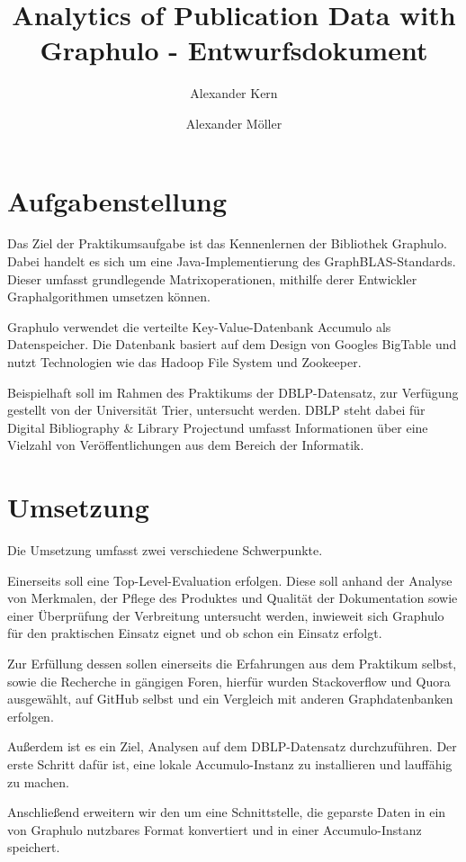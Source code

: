 \documentclass{article}
\title{Analytics of Publication Data with Graphulo - Entwurfsdokument}
\author{Alexander Kern \and Alexander Möller}
\begin{document}
\maketitle
	
\section{Aufgabenstellung}

Das Ziel der Praktikumsaufgabe ist das Kennenlernen der Bibliothek Graphulo. Dabei handelt es sich um eine Java-Implementierung des GraphBLAS-Standards. Dieser umfasst grundlegende Matrixoperationen, mithilfe derer Entwickler Graphalgorithmen umsetzen können. \cite{graph}

Graphulo verwendet die verteilte Key-Value-Datenbank Accumulo als Datenspeicher. Die Datenbank basiert auf dem Design von Googles BigTable und nutzt Technologien wie das Hadoop File System und Zookeeper. \cite{acc} 

Beispielhaft soll im Rahmen des Praktikums der DBLP-Datensatz, zur Verfügung gestellt von der Universität Trier, untersucht werden. DBLP steht dabei für \glqq Digital Bibliography \& Library Project\grqq und umfasst Informationen über eine Vielzahl von Veröffentlichungen aus dem Bereich der Informatik. \cite{dblp}


\section{Umsetzung}

Die Umsetzung umfasst zwei verschiedene Schwerpunkte. 

Einerseits soll eine Top-Level-Evaluation erfolgen. Diese soll anhand der Analyse von Merkmalen, der Pflege des Produktes und Qualität der Dokumentation sowie einer Überprüfung der Verbreitung untersucht werden, inwieweit sich Graphulo für den praktischen Einsatz eignet und ob schon ein Einsatz erfolgt.  

Zur Erfüllung dessen sollen einerseits die Erfahrungen aus dem Praktikum selbst, sowie die Recherche in gängigen Foren, hierfür wurden Stackoverflow und Quora ausgewählt, auf GitHub selbst und ein Vergleich mit anderen Graphdatenbanken erfolgen.

Außerdem ist es ein Ziel, Analysen auf dem DBLP-Datensatz durchzuführen. Der erste Schritt dafür ist, eine lokale Accumulo-Instanz zu installieren und lauffähig zu machen.

Anschließend erweitern wir den \cite{pars} um eine Schnittstelle, die geparste Daten in ein von Graphulo nutzbares Format konvertiert und in einer Accumulo-Instanz speichert.
\end{document}
